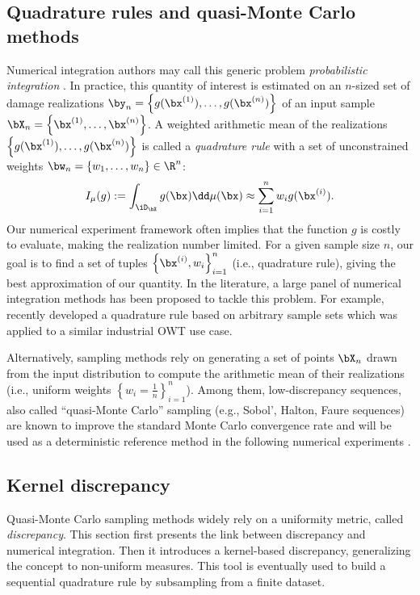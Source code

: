 \subsection{Quadrature rules and quasi-Monte Carlo methods}
Numerical integration authors may call this generic problem \emph{probabilistic integration} \citep{briol_oates_2019}. 
In practice, this quantity of interest is estimated on an $n$-sized set of damage realizations $\by_n = \left\{g(\bx^{(1)}), \dots, g(\bx^{(n)})\right\}$ of an input sample $\bX_n = \left\{\bx^{(1)}, \dots, \bx^{(n)}\right\}$. 
A weighted arithmetic mean of the realizations $\left\{g(\bx^{(1)}), \dots, g(\bx^{(n)})\right\}$ is called a \emph{quadrature rule} with a set of unconstrained weights $\bw_n = \{w_1, \dots, w_n\} \in \R^n$:
\begin{equation}
    I_{\mu}(g) := \int_{\iD_\bX} g(\bx) \dd\mu(\bx) \approx \sum_{i=1}^n w_i g(\bx^{(i)}).
    \label{eq:quadrature_rule}
\end{equation}
Our numerical experiment framework often implies that the function $g$ is costly to evaluate, making the realization number limited. 
For a given sample size $n$, our goal is to find a set of tuples $\left\{\bx^{(i)}, w_i \right\}_{i=1}^n$ (i.e., quadrature rule), giving the best approximation of our quantity. 
In the literature, a large panel of numerical integration methods has been proposed to tackle this problem. 
For example, \cite{bos_2020} recently developed a quadrature rule based on arbitrary sample sets which was applied to a similar industrial OWT use case.  

Alternatively, sampling methods rely on generating a set of points $\bX_n$ drawn from the input distribution to compute the arithmetic mean of their realizations (i.e., uniform weights $\left\{w_i = \frac1n \right\}_{i=1}^n$). 
Among them, low-discrepancy sequences, also called ``quasi-Monte Carlo'' sampling (e.g., Sobol', Halton, Faure sequences) are known to improve the standard Monte Carlo convergence rate and will be used as a deterministic reference method in the following numerical experiments \citep{leobacher_2014}.

\subsection{Kernel discrepancy}
Quasi-Monte Carlo sampling methods widely rely on a uniformity metric, called \textit{discrepancy}. 
This section first presents the link between discrepancy and numerical integration. 
Then it introduces a kernel-based discrepancy, generalizing the concept to non-uniform measures. 
This tool is eventually used to build a sequential quadrature rule by subsampling from a finite dataset.

